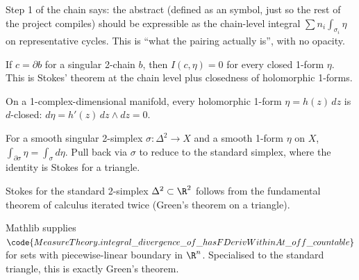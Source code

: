 \begin{layman}
Step 1 of the chain says: the abstract  (defined as
an  symbol, just so the rest of the project compiles)
should be expressible as the chain-level integral $\sum n_{i}\int_{\sigma_{i}}\eta$
on representative cycles.  This is ``what the pairing actually is'',
with no opacity.
\end{layman}

\begin{lemma}
\label{lem:pn-r2}
If $c=\partial b$ for a singular 2-chain $b$, then $I(c,\eta)=0$ for
every closed 1-form $\eta$. This is Stokes' theorem at the chain level
plus closedness of holomorphic 1-forms.
\leanok
\end{lemma}

\begin{lemma}
\label{lem:pn-r3}
On a 1-complex-dimensional manifold, every holomorphic 1-form
$\eta=h(z)\,dz$ is $d$-closed: $d\eta = h'(z)\,dz\wedge dz = 0$.
\leanok
\end{lemma}

\begin{lemma}
\label{lem:pn-r4}
For a smooth singular 2-simplex $\sigma:\Delta^{2}\to X$ and a smooth
1-form $\eta$ on $X$, $\int_{\partial\sigma}\eta=\int_{\sigma}d\eta$.
Pull back via $\sigma$ to reduce to the standard simplex, where the
identity is Stokes for a triangle.
\leanok
\end{lemma}

\begin{lemma}
\label{lem:pn-r5}
Stokes for the standard 2-simplex $\Delta^{2}\subset\R^{2}$ follows
from the fundamental theorem of calculus iterated twice (Green's
theorem on a triangle).
\leanok
\end{lemma}

\begin{lemma}
\label{lem:pn-r6}
Mathlib supplies $\code{MeasureTheory.integral\_divergence\_of\_hasFDerivWithinAt\_off\_countable}$
for sets with piecewise-linear boundary in $\R^{n}$.  Specialised to the
standard triangle, this is exactly Green's theorem.
\leanok\mathlibok
\end{lemma}

